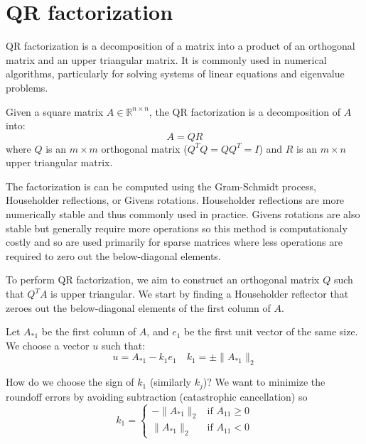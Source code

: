 \chapter{QR factorization}
QR factorization is a decomposition of a matrix into a product of an orthogonal matrix and an upper triangular matrix.
It is commonly used in numerical algorithms, particularly for solving systems of linear equations and eigenvalue problems.

Given a square matrix $A \in \mathbb{R}^{n \times n}$, the QR factorization is a decomposition of $A$ into:
\begin{equation*}
    A = QR
\end{equation*}
where $Q$ is an $m \times m$ orthogonal matrix ($Q^TQ = QQ^T = I$) and $R$ is an $m \times n$ upper triangular matrix.

The factorization is can be computed using the Gram-Schmidt process, Householder reflections, or Givens rotations.
Householder reflections are more numerically stable and thus commonly used in practice.
Givens rotations are also stable but generally require more operations so this method is computationaly costly
and so are used primarily for sparse matrices where less operations are required to zero out the below-diagonal elements.

To perform QR factorization, we aim to construct an orthogonal matrix $Q$ such that $Q^TA$ is upper triangular. We start by finding a Householder reflector that zeroes out the below-diagonal elements of the first column of $A$.

Let $A_{*1}$ be the first column of $A$, and $e_1$ be the first unit vector of the same size. We choose a vector $u$ such that:
\begin{equation*}
    u = A_{*1} - k_1e_1 \quad k_1 = \pm \|A_{*1}\|_2
\end{equation*}

\begin{mdframed}
How do we choose the sign of $k_1$ (similarly $k_j$)?
We want to minimize the roundoff errors by avoiding subtraction
(catastrophic cancellation) so
\[
k_1 = \begin{cases}
    -\|A_{*1}\|_2 & \text{if } A_{11} \geq 0 \\
    \|A_{*1}\|_2 & \text{if } A_{11} < 0
\end{cases}
\]
\end{mdframed}

